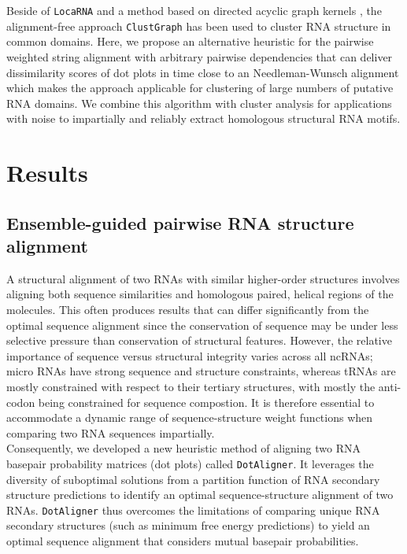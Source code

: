 \documentclass[a4paper,11pt]{article}
\newcommand\dotaligner{\texttt{DotAligner}}
\newcommand\clustgraph{\texttt{ClustGraph}}
\newcommand\locarna{\texttt{LocaRNA}}
\begin{document}
Beside of \locarna{} and a method based on directed acyclic graph kernels
\cite{Sato18647390}, the alignment-free approach \clustgraph{}
\cite{Heyne22689765} has been used to cluster RNA structure in common domains.
Here, we propose an alternative heuristic for the pairwise weighted string
alignment with arbitrary pairwise dependencies that can deliver dissimilarity
scores of dot plots in time close to an Needleman-Wunsch alignment which makes
the approach applicable for clustering of large numbers of putative RNA domains.
We combine this algorithm with cluster analysis for applications with 
noise to impartially and reliably extract homologous structural RNA motifs. \\ 

\section{ Results }
\subsection*{ Ensemble-guided pairwise RNA structure alignment} 

A structural alignment of two RNAs with similar higher-order structures 
involves aligning both sequence similarities and homologous paired,
helical regions of the molecules. This often produces results that 
can differ significantly from the optimal sequence alignment since 
the conservation of sequence may be under less selective pressure than 
conservation of structural features. However, the relative importance 
of sequence  versus structural integrity varies across all ncRNAs; micro 
RNAs have strong sequence and structure constraints, whereas tRNAs
are mostly constrained with respect to their tertiary structures, with mostly
the anti-codon being constrained for sequence compostion. It is 
therefore essential to accommodate a dynamic range of sequence-structure 
weight functions when comparing two RNA sequences impartially. \\
 
Consequently, we developed a new heuristic method of aligning two RNA 
basepair probability matrices (dot plots) called \dotaligner{}. It leverages the diversity of 
suboptimal solutions from a partition function of RNA secondary structure 
predictions to identify an optimal sequence-structure alignment of two RNAs. 
\dotaligner{} thus overcomes the limitations of comparing unique RNA 
secondary structures (such as minimum free energy predictions) to yield 
an optimal sequence alignment that considers mutual basepair probabilities.\\
\end{document}
